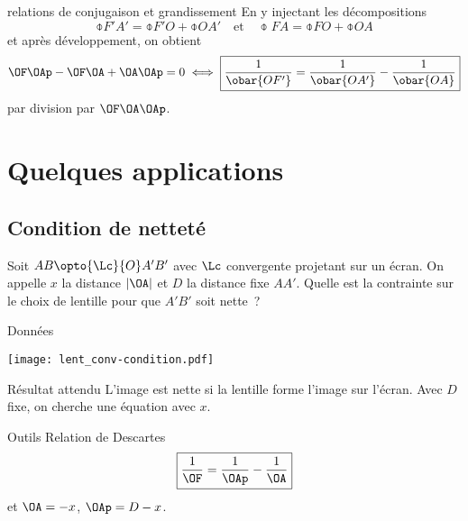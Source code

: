 \documentclass[../main/main.tex]{subfiles}
\begin{document}
\begin{demo}[label=demo:lent_rc, breakable]{relations de conjugaison et grandissement}
    En y injectant les décompositions
    \begin{equation*}
        \obar{F'A'} = \obar{F'O} + \obar{OA'}
        \quad\text{et}\quad
        \obar{FA} = \obar{FO} + \obar{OA}
    \end{equation*}
    et après développement, on obtient
    \begin{equation*}
        \OF\OAp - \OF\OA + \OA\OAp = 0
        \iff
        \boxed{\frac{1}{\obar{OF'}} =
        \frac{1}{\obar{OA'}} - \frac{1}{\obar{OA}}}
    \end{equation*}
    par division par $\OF\OA\OAp$.
\end{demo}

\section{Quelques applications}

\subsection{Condition de netteté}

Soit $AB \opto{\Lc}{O} A'B'$ avec $\Lc$ convergente projetant sur un écran. On
appelle $x$ la distance $ \left| \OA \right|$ et $D$ la distance fixe $AA'$.
Quelle est la contrainte sur le choix de lentille pour que $A'B'$ soit nette~?

\begin{tcbraster}[raster columns=2, raster equal height=rows]
    \begin{NCdefi}[]{Données}
        \begin{center}
            \texttt{[image: lent\_conv-condition.pdf]}
            \label{fig:lent_condi}
        \end{center}
    \end{NCdefi}
    \begin{tcolorbox}[blankest, raster multicolumn=1]
        \begin{tcbraster}[raster columns=1]
            \begin{NCprop}[]{Résultat attendu}
                L'image est nette si la lentille forme l'image sur l'écran. Avec
                $D$ fixe, on cherche une équation avec $x$.
            \end{NCprop}
            \begin{NCrapp}[]{Outils}
                Relation de Descartes
                \[\boxed{ \frac{1}{\OF} = \frac{1}{\OAp} - \frac{1}{\OA}}\]
                et $\OA = -x$, $\OAp = D-x$.
            \end{NCrapp}
        \end{tcbraster}
    \end{tcolorbox}
\end{tcbraster}
\end{document}
